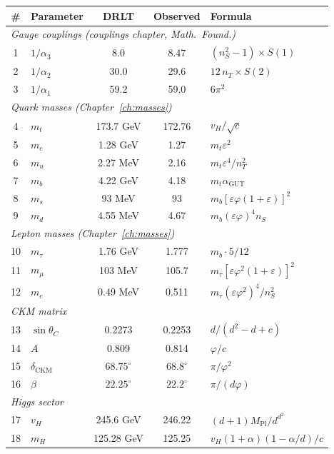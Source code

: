 \begin{center}
\small
\begin{tabular}{clccl}
\hline
\# & Parameter & DRLT & Observed & Formula \\
\hline
\multicolumn{5}{l}{\emph{Gauge couplings (couplings chapter, \textit{Math.\ Found.})}} \\
1 & $1/\alpha_3$ & 8.0 & 8.47 & $(n_S^2-1) \times S(1)$ \\
2 & $1/\alpha_2$ & 30.0 & 29.6 & $12\,n_T \times S(2)$ \\
3 & $1/\alpha_1$ & 59.2 & 59.0 & $6\pi^2$ \\
\hline
\multicolumn{5}{l}{\emph{Quark masses (Chapter~\ref{ch:masses})}} \\
4 & $m_t$ & 173.7 GeV & 172.76 & $v_H/\sqrt{c}$ \\
5 & $m_c$ & 1.28 GeV & 1.27 & $m_t\varepsilon^2$ \\
6 & $m_u$ & 2.27 MeV & 2.16 & $m_t\varepsilon^4/n_T^2$ \\
7 & $m_b$ & 4.22 GeV & 4.18 & $m_t\alpha_\text{GUT}$ \\
8 & $m_s$ & 93 MeV & 93 & $m_b[\varepsilon\varphi(1\!+\!\varepsilon)]^2$ \\
9 & $m_d$ & 4.55 MeV & 4.67 & $m_b(\varepsilon\varphi)^4 n_S$ \\
\hline
\multicolumn{5}{l}{\emph{Lepton masses (Chapter~\ref{ch:masses})}} \\
10 & $m_\tau$ & 1.76 GeV & 1.777 & $m_b \cdot 5/12$ \\
11 & $m_\mu$ & 103 MeV & 105.7 & $m_\tau[\varepsilon\varphi^2(1\!+\!\varepsilon)]^2$ \\
12 & $m_e$ & 0.49 MeV & 0.511 & $m_\tau(\varepsilon\varphi^2)^4/n_S^2$ \\
\hline
\multicolumn{5}{l}{\emph{CKM matrix}} \\
13 & $\sin\theta_C$ & 0.2273 & 0.2253 & $d/(d^2\!-\!d\!+\!c)$ \\
14 & $A$ & 0.809 & 0.814 & $\varphi/c$ \\
15 & $\delta_\text{CKM}$ & $68.75^\circ$ & $68.8^\circ$ & $\pi/\varphi^2$ \\
16 & $\beta$ & $22.25^\circ$ & $22.2^\circ$ & $\pi/(d\varphi)$ \\
\hline
\multicolumn{5}{l}{\emph{Higgs sector}} \\
17 & $v_H$ & 245.6 GeV & 246.22 & $(d\!+\!1)M_\text{Pl}/d^{d^2}$ \\
18 & $m_H$ & 125.28 GeV & 125.25 & $v_H(1\!+\!\alpha)(1\!-\!\alpha/d)/c$ \\

\end{tabular}
\end{center}
